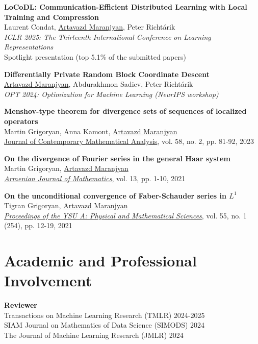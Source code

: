 \documentclass[11pt,a4paper,sans]{moderncv}        %
\newcommand{\red}{\color{cherry}}
\newcommand{\highlight}[1]{{\red #1}}
\begin{document}
\begin{etaremune}
\item \textbf{LoCoDL: Communication-Efficient Distributed Learning with Local Training and Compression}\\
Laurent Condat, \underline{Artavazd Maranjyan}, Peter Richtárik\\
\textit{ICLR 2025: The Thirteenth International Conference on Learning Representations}\\
\highlight{Spotlight presentation (top 5.1\% of the submitted papers)}

\item \textbf{Differentially Private Random Block Coordinate Descent}\\
\underline{Artavazd Maranjyan}, Abdurakhmon Sadiev, Peter Richtárik\\
\textit{OPT 2024: Optimization for Machine Learning (NeurIPS workshop)}

\item \textbf{Menshov-type theorem for divergence sets of sequences of localized operators}\\
Martin Grigoryan, Anna Kamont, \underline{Artavazd Maranjyan}\\
\href{https://doi.org/10.3103/S106836232302005X}{Journal of Contemporary Mathematical Analysis}, vol. 58, no. 2, pp. 81-92, 2023

\item \textbf{On the divergence of Fourier series in the general Haar system}\\
Martin Grigoryan, \underline{Artavazd Maranjyan}\\ \textcolor{accent}{\href{https://doi.org/10.52737/18291163-2021.13.6-1-10}{\textit{Armenian Journal of Mathematics}}}, vol. 13, pp. 1-10, 2021

\item \textbf{On the unconditional convergence of Faber-Schauder series in $L^1$}\\
Tigran Grigoryan, \underline{Artavazd Maranjyan}\\
\textcolor{accent}{\href{http://www.old.ysu.am/files/vol55\_no1\_2021\_pp12\%E2\%80\%9319.pdf}{\textit{Proceedings of the YSU A: Physical and Mathematical Sciences}}}, vol. 55, no. 1 (254), pp. 12-19, 2021
\end{etaremune}

\section{Academic and Professional Involvement}

\textbf{Reviewer}\\
Transactions on Machine Learning Research (TMLR) 2024-2025\\
SIAM Journal on Mathematics of Data Science (SIMODS) 2024\\
The Journal of Machine Learning Research (JMLR) 2024
\end{document}
